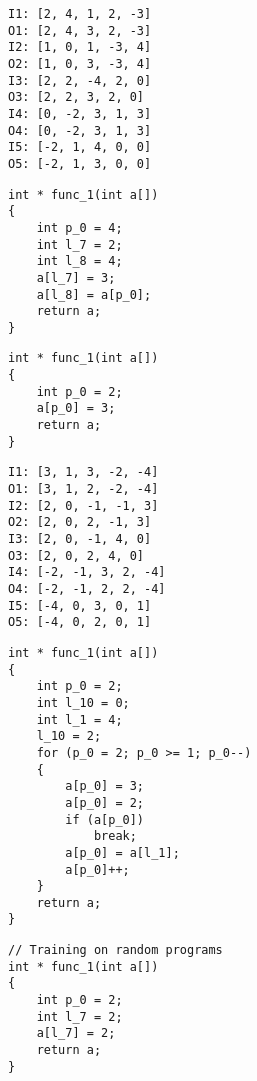 \begin{figure}
\begin{minipage}{0.25\textwidth}
\begin{verbatim}
I1: [2, 4, 1, 2, -3]
O1: [2, 4, 3, 2, -3]
I2: [1, 0, 1, -3, 4]
O2: [1, 0, 3, -3, 4]
I3: [2, 2, -4, 2, 0]
O3: [2, 2, 3, 2, 0]
I4: [0, -2, 3, 1, 3]
O4: [0, -2, 3, 1, 3]
I5: [-2, 1, 4, 0, 0]
O5: [-2, 1, 3, 0, 0]
\end{verbatim}
\end{minipage}
\begin{minipage}{0.40\textwidth}
\begin{verbatim}
int * func_1(int a[])
{
    int p_0 = 4;
    int l_7 = 2;
    int l_8 = 4;
    a[l_7] = 3;
    a[l_8] = a[p_0];
    return a;
}
\end{verbatim}
\end{minipage}
\begin{minipage}{0.33\textwidth}
\begin{verbatim}
int * func_1(int a[])
{
    int p_0 = 2;
    a[p_0] = 3;
    return a;
}
\end{verbatim}
\end{minipage}
\par\vspace{3mm}
\begin{minipage}{0.25\textwidth}
\begin{verbatim}
I1: [3, 1, 3, -2, -4]
O1: [3, 1, 2, -2, -4]
I2: [2, 0, -1, -1, 3]
O2: [2, 0, 2, -1, 3]
I3: [2, 0, -1, 4, 0]
O3: [2, 0, 2, 4, 0]
I4: [-2, -1, 3, 2, -4]
O4: [-2, -1, 2, 2, -4]
I5: [-4, 0, 3, 0, 1]
O5: [-4, 0, 2, 0, 1]
\end{verbatim}
\end{minipage}
\begin{minipage}{0.40\textwidth}
\begin{verbatim}
int * func_1(int a[])
{
    int p_0 = 2;
    int l_10 = 0;
    int l_1 = 4;
    l_10 = 2;
    for (p_0 = 2; p_0 >= 1; p_0--)
    {
        a[p_0] = 3;
        a[p_0] = 2;
        if (a[p_0])
            break;
        a[p_0] = a[l_1];
        a[p_0]++;
    }
    return a;
}
\end{verbatim}
\end{minipage}
\begin{minipage}{0.33\textwidth}
\begin{verbatim}
// Training on random programs
int * func_1(int a[])
{
    int p_0 = 2;
    int l_7 = 2;
    a[l_7] = 2;
    return a;
}


\end{verbatim}
\end{minipage}
\end{figure}
